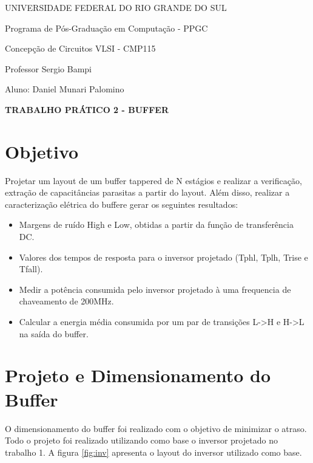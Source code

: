 \documentclass[a4paper,10pt] {article}
\begin{document}
\begin {center}
UNIVERSIDADE FEDERAL DO RIO GRANDE DO SUL

Programa de Pós-Graduação em Computação - PPGC

Concepção de Circuitos VLSI - CMP115

Professor Sergio Bampi

Aluno: Daniel Munari Palomino 

\vspace{7mm}
\textbf{ TRABALHO PRÁTICO 2 - BUFFER }
\vspace{7mm}

\end{center}

\section{Objetivo}
Projetar um layout de um buffer tappered de N estágios e realizar a verificação, extração de capacitâncias parasitas a partir do layout. Além disso, realizar a caracterização elétrica do buffere gerar os seguintes resultados:

\begin{itemize}
\item Margens de ruído High e Low, obtidas a partir da função de transferência DC.
\item Valores dos tempos de resposta para o inversor projetado (Tphl, Tplh, Trise e Tfall).
\item Medir a potência consumida pelo inversor projetado à uma frequencia de chaveamento de 200MHz.
\item Calcular a energia média consumida por um par de transições L->H e H->L na saída do buffer.
\end{itemize}

\section{Projeto e Dimensionamento do Buffer}
O dimensionamento do buffer foi realizado com o objetivo de minimizar o atraso. Todo o projeto foi realizado utilizando como base o inversor projetado no trabalho 1. A figura \ref{fig:inv} apresenta o layout do inversor utilizado como base.
\end{document}
